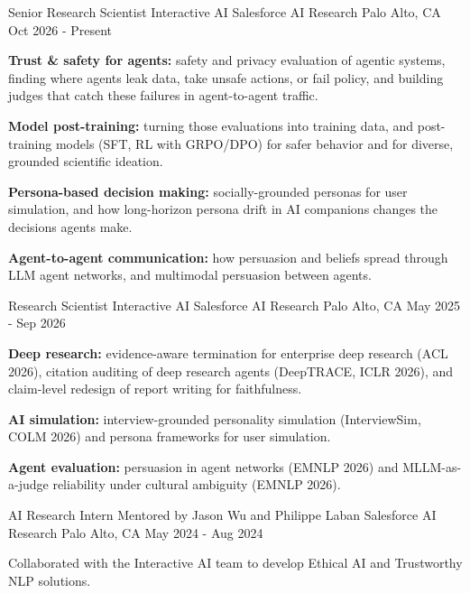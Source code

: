 \documentclass[11pt, letterpaper]{awesome-cv}
\begin{document}
\begin{cventries}
  \cventry
    {Senior Research Scientist \textbar{} Interactive AI}
    {Salesforce AI Research}
    {Palo Alto, CA}
    {Oct 2026 - Present}
    {
      \begin{cvitems}
        \item {\textbf{Trust \& safety for agents:} safety and privacy evaluation of agentic systems, finding where agents leak data, take unsafe actions, or fail policy, and building judges that catch these failures in agent-to-agent traffic.}
        \item {\textbf{Model post-training:} turning those evaluations into training data, and post-training models (SFT, RL with GRPO/DPO) for safer behavior and for diverse, grounded scientific ideation.}
        \item {\textbf{Persona-based decision making:} socially-grounded personas for user simulation, and how long-horizon persona drift in AI companions changes the decisions agents make.}
        \item {\textbf{Agent-to-agent communication:} how persuasion and beliefs spread through LLM agent networks, and multimodal persuasion between agents.}
      \end{cvitems}
    }%
  \cventry
    {Research Scientist \textbar{} Interactive AI}
    {Salesforce AI Research}
    {Palo Alto, CA}
    {May 2025 - Sep 2026}
    {
      \begin{cvitems}
        \item {\textbf{Deep research:} evidence-aware termination for enterprise deep research (ACL 2026), citation auditing of deep research agents (DeepTRACE, ICLR 2026), and claim-level redesign of report writing for faithfulness.}
        \item {\textbf{AI simulation:} interview-grounded personality simulation (InterviewSim, COLM 2026) and persona frameworks for user simulation.}
        \item {\textbf{Agent evaluation:} persuasion in agent networks (EMNLP 2026) and MLLM-as-a-judge reliability under cultural ambiguity (EMNLP 2026).}
      \end{cvitems}
    }%
  \cventry
    {AI Research Intern \textbar{} Mentored by Jason Wu and Philippe Laban}
    {Salesforce AI Research}
    {Palo Alto, CA}
    {May 2024 - Aug 2024}
    {
      \begin{cvitems}
        \item {Collaborated with the Interactive AI team to develop Ethical AI and Trustworthy NLP solutions.}

\end{cvitems}}
\end{cventries}
\end{document}
